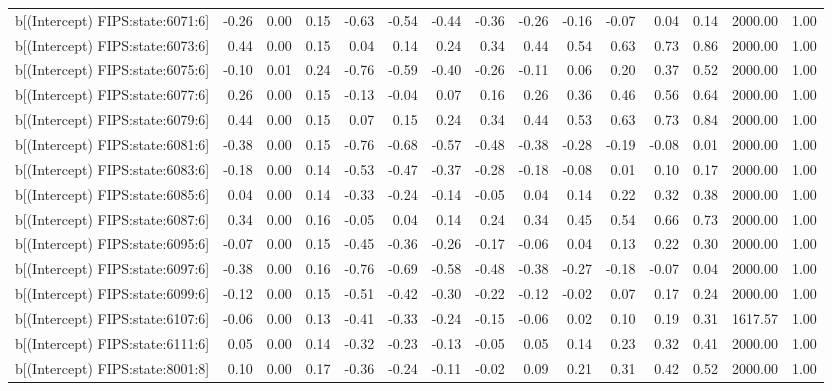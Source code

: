\begin{table}[ht]
\begin{tabular}{rrrrrrrrrrrrrrr}
  b[(Intercept) FIPS:state:6071:6] & -0.26 & 0.00 & 0.15 & -0.63 & -0.54 & -0.44 & -0.36 & -0.26 & -0.16 & -0.07 & 0.04 & 0.14 & 2000.00 & 1.00 \\ 
  b[(Intercept) FIPS:state:6073:6] & 0.44 & 0.00 & 0.15 & 0.04 & 0.14 & 0.24 & 0.34 & 0.44 & 0.54 & 0.63 & 0.73 & 0.86 & 2000.00 & 1.00 \\ 
  b[(Intercept) FIPS:state:6075:6] & -0.10 & 0.01 & 0.24 & -0.76 & -0.59 & -0.40 & -0.26 & -0.11 & 0.06 & 0.20 & 0.37 & 0.52 & 2000.00 & 1.00 \\ 
  b[(Intercept) FIPS:state:6077:6] & 0.26 & 0.00 & 0.15 & -0.13 & -0.04 & 0.07 & 0.16 & 0.26 & 0.36 & 0.46 & 0.56 & 0.64 & 2000.00 & 1.00 \\ 
  b[(Intercept) FIPS:state:6079:6] & 0.44 & 0.00 & 0.15 & 0.07 & 0.15 & 0.24 & 0.34 & 0.44 & 0.53 & 0.63 & 0.73 & 0.84 & 2000.00 & 1.00 \\ 
  b[(Intercept) FIPS:state:6081:6] & -0.38 & 0.00 & 0.15 & -0.76 & -0.68 & -0.57 & -0.48 & -0.38 & -0.28 & -0.19 & -0.08 & 0.01 & 2000.00 & 1.00 \\ 
  b[(Intercept) FIPS:state:6083:6] & -0.18 & 0.00 & 0.14 & -0.53 & -0.47 & -0.37 & -0.28 & -0.18 & -0.08 & 0.01 & 0.10 & 0.17 & 2000.00 & 1.00 \\ 
  b[(Intercept) FIPS:state:6085:6] & 0.04 & 0.00 & 0.14 & -0.33 & -0.24 & -0.14 & -0.05 & 0.04 & 0.14 & 0.22 & 0.32 & 0.38 & 2000.00 & 1.00 \\ 
  b[(Intercept) FIPS:state:6087:6] & 0.34 & 0.00 & 0.16 & -0.05 & 0.04 & 0.14 & 0.24 & 0.34 & 0.45 & 0.54 & 0.66 & 0.73 & 2000.00 & 1.00 \\ 
  b[(Intercept) FIPS:state:6095:6] & -0.07 & 0.00 & 0.15 & -0.45 & -0.36 & -0.26 & -0.17 & -0.06 & 0.04 & 0.13 & 0.22 & 0.30 & 2000.00 & 1.00 \\ 
  b[(Intercept) FIPS:state:6097:6] & -0.38 & 0.00 & 0.16 & -0.76 & -0.69 & -0.58 & -0.48 & -0.38 & -0.27 & -0.18 & -0.07 & 0.04 & 2000.00 & 1.00 \\ 
  b[(Intercept) FIPS:state:6099:6] & -0.12 & 0.00 & 0.15 & -0.51 & -0.42 & -0.30 & -0.22 & -0.12 & -0.02 & 0.07 & 0.17 & 0.24 & 2000.00 & 1.00 \\ 
  b[(Intercept) FIPS:state:6107:6] & -0.06 & 0.00 & 0.13 & -0.41 & -0.33 & -0.24 & -0.15 & -0.06 & 0.02 & 0.10 & 0.19 & 0.31 & 1617.57 & 1.00 \\ 
  b[(Intercept) FIPS:state:6111:6] & 0.05 & 0.00 & 0.14 & -0.32 & -0.23 & -0.13 & -0.05 & 0.05 & 0.14 & 0.23 & 0.32 & 0.41 & 2000.00 & 1.00 \\ 
  b[(Intercept) FIPS:state:8001:8] & 0.10 & 0.00 & 0.17 & -0.36 & -0.24 & -0.11 & -0.02 & 0.09 & 0.21 & 0.31 & 0.42 & 0.52 & 2000.00 & 1.00 \\ 

\end{tabular}
\end{table}
